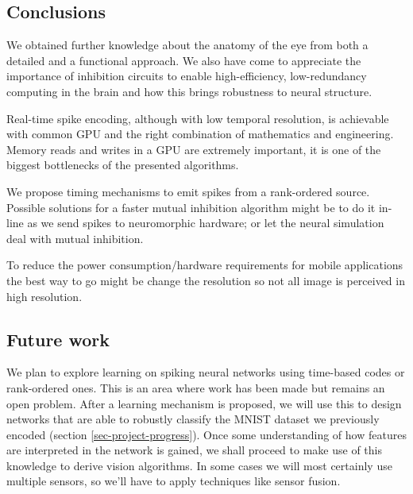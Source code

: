 \subsection{Conclusions}
We obtained further knowledge about the anatomy of the eye from both a detailed 
and a functional approach. We also have come to appreciate the importance of 
inhibition circuits to enable high-efficiency, low-redundancy computing in the 
brain and how this brings robustness to neural structure. 

Real-time spike encoding, although with low temporal resolution, is achievable 
with common GPU and the right combination of mathematics and 
engineering. Memory reads and writes in a GPU are extremely important, it is 
one of the biggest bottlenecks of the presented algorithms.

We propose timing mechanisms to emit spikes from a rank-ordered
source. Possible solutions for a faster mutual inhibition algorithm 
might be to do it in-line as we send spikes to neuromorphic hardware; 
or let the neural simulation deal with mutual inhibition.

To reduce the power consumption/hardware requirements for mobile applications 
the best way to go might be change the resolution so not all image is 
perceived in high resolution.

\subsection{Future work}
We plan to explore learning on spiking neural networks using time-based codes or
rank-ordered ones. This is an area where work has been made but remains an
open problem.
After a learning mechanism is proposed, we will use this to design networks that
are able to robustly classify the MNIST dataset we previously encoded (section 
\ref{sec-project-progress}). Once some understanding of how features are
interpreted in the network is gained, we shall proceed to make use of this 
knowledge to derive vision algorithms. In some cases we will most certainly 
use multiple sensors, so we'll have to apply techniques like sensor fusion.
